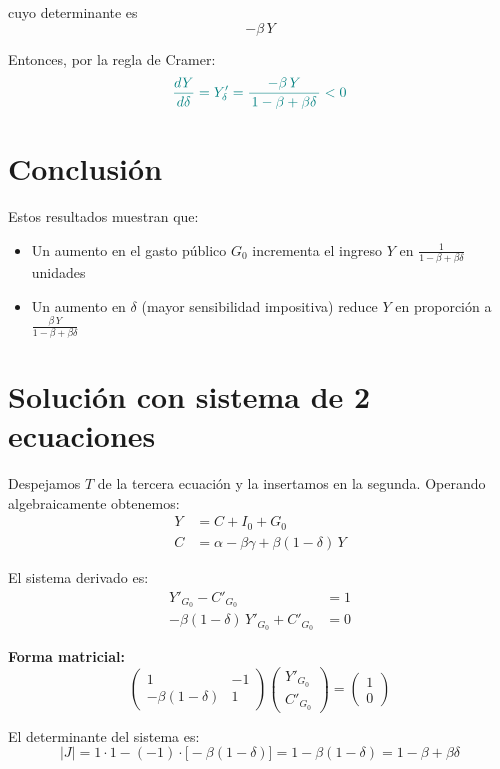 \documentclass{article}
\begin{document}
cuyo determinante es
\[
-\beta\,Y
\]

Entonces, por la regla de Cramer:
\[
\color{teal}
\frac{dY}{d\delta} = Y'_{\delta} = \frac{-\beta\,Y}{\,1 - \beta + \beta\delta\,} < 0
\]

\bigskip
\section*{Conclusión}

Estos resultados muestran que:
\begin{itemize}
  \item Un aumento en el gasto público \(G_0\) incrementa el ingreso \(Y\) en \(\frac{1}{1 - \beta + \beta\delta}\) unidades
  \item Un aumento en \(\delta\) (mayor sensibilidad impositiva) reduce \(Y\) en proporción a \(\frac{\beta\,Y}{1 - \beta + \beta\delta}\)
\end{itemize}
\section*{Solución con sistema de 2 ecuaciones}

Despejamos \(T\) de la tercera ecuación y la insertamos en la segunda. Operando algebraicamente obtenemos:
\begin{align*}
Y &= C + I_0 + G_0 \\
C &= \alpha - \beta\gamma + \beta(1-\delta)\,Y
\end{align*}

\medskip
El sistema derivado es:
\begin{align*}
Y'_{G_0} - C'_{G_0} &= 1 \\[1mm]
-\beta(1-\delta)\,Y'_{G_0} + C'_{G_0} &= 0
\end{align*}

\medskip
\textbf{Forma matricial:}
\[
\begin{pmatrix}
1 & -1\\[0.8mm]
-\beta(1-\delta) & 1
\end{pmatrix}
\begin{pmatrix}
Y'_{G_0}\\[0.8mm]
C'_{G_0}
\end{pmatrix}
=
\begin{pmatrix}
1\\[0.8mm]
0
\end{pmatrix}
\]

El determinante del sistema es:
\[
|J| = 1\cdot 1 - (-1)\cdot\bigl[-\beta(1-\delta)\bigr] 
= 1 - \beta(1-\delta) 
= 1 - \beta + \beta\delta
\]
\end{document}
